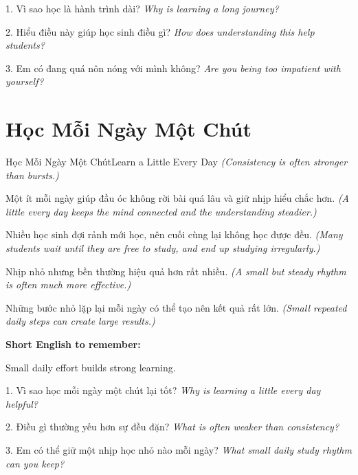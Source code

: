 \begin{tuhocnhanh}
1. Vì sao học là hành trình dài? \textit{Why is learning a long journey?}

2. Hiểu điều này giúp học sinh điều gì? \textit{How does understanding this help students?}

3. Em có đang quá nôn nóng với mình không? \textit{Are you being too impatient with yourself?}
\end{tuhocnhanh}
\ngancach

\section{Học Mỗi Ngày Một Chút}
\begin{truyen}{Học Mỗi Ngày Một Chút}{Learn a Little Every Day}
\textit{(Consistency is often stronger than bursts.)}

Một ít mỗi ngày giúp đầu óc không rời bài quá lâu và giữ nhịp hiểu chắc hơn.
\textit{(A little every day keeps the mind connected and the understanding steadier.)}

Nhiều học sinh đợi rảnh mới học, nên cuối cùng lại không học được đều.
\textit{(Many students wait until they are free to study, and end up studying irregularly.)}

Nhịp nhỏ nhưng bền thường hiệu quả hơn rất nhiều.
\textit{(A small but steady rhythm is often much more effective.)}
\end{truyen}

\begin{baihoc}
Những bước nhỏ lặp lại mỗi ngày có thể tạo nên kết quả rất lớn.
\textit{(Small repeated daily steps can create large results.)}
\end{baihoc}

\begin{ghinhoanh}
\textbf{Short English to remember:}

Small daily effort builds strong learning.

\end{ghinhoanh}

\begin{tuhocnhanh}
1. Vì sao học mỗi ngày một chút lại tốt? \textit{Why is learning a little every day helpful?}

2. Điều gì thường yếu hơn sự đều đặn? \textit{What is often weaker than consistency?}

3. Em có thể giữ một nhịp học nhỏ nào mỗi ngày? \textit{What small daily study rhythm can you keep?}
\end{tuhocnhanh}
\ngancach


